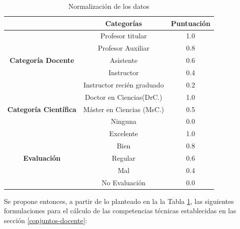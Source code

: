 \begin{table} [H]
	\centering
	\caption{Normalización de los datos} \label{norm-datos-carga}
	\begin{tabular}{|c|c|c|}
		\cline{2-3}
		             \multicolumn{1}{c|}{}               &    \textbf{Categorías}     & \textbf{Puntuación} \\ \hline
		 \multirow{5}{3cm}{\textbf{Categoría Docente}}   &      Profesor titular      &         1.0         \\ \cline{2-3}
		                                                 &     Profesor Auxiliar      &         0.8         \\ \cline{2-3}
		                                                 &         Asistente          &         0.6         \\ \cline{2-3}
		                                                 &         Instructor         &         0.4         \\ \cline{2-3}
		                                                 & Instructor recién graduado &         0.2         \\ \hline\hline
		\multirow{3}{3cm}{\textbf{Categoría Científica}} &  Doctor en Ciencias(DrC.)  &         1.0         \\ \cline{2-3}
		                                                 & Máster en Ciencias (MsC.)  &         0.5         \\ \cline{2-3}
		                                                 &          Ninguna           &         0.0         \\ \hline\hline
		     \multirow{5}{3cm}{\textbf{Evaluación}}      &         Excelente          &         1.0         \\ \cline{2-3}
		                                                 &            Bien            &         0.8         \\ \cline{2-3}
		                                                 &          Regular           &         0.6         \\ \cline{2-3}
		                                                 &            Mal             &         0.4         \\ \cline{2-3}
		                                                 &       No Evaluación        &         0.0         \\ \hline
	\end{tabular}
\end{table}

Se propone entonces, a partir de lo planteado en la la Tabla \ref{norm-datos-carga}, las siguientes formulaciones para el cálculo de las competencias técnicas establecidas en las sección \ref{conjuntos-docente}:

